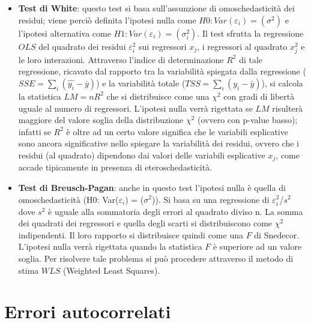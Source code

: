 \documentclass[a4page, 11pt]{article} %
\begin{document}
\begin{itemize}
\item \textbf{Test di White}: questo test si basa sull’assunzione di omoschedasticità dei residui; viene perciò definita l’ipotesi nulla come $H0: Var(\varepsilon_i) = (\sigma^2)$ e l’ipotesi alternativa come $H1: Var(\varepsilon_i ) = ( \sigma^2_i )$.
Il test sfrutta la regressione $OLS$ del quadrato dei residui $\varepsilon_i^2$ sui regressori $x_j$, i regressori al quadrato $x_j^2$ e le loro interazioni.
Attraverso l'indice di determinazione $R^{2}$ di tale regressione, ricavato dal rapporto tra la variabilità spiegata dalla regressione ($SSE = \sum_{i}(\hat{y_i} - \bar{y})$) e la variabilità totale ($TSS = \sum_{i} (y_i - \bar{y})$), si calcola la statistica $LM=n R^{2}$ che si distribuisce come una $\chi^{2}$ con gradi di libertà uguale al numero di regressori. L’ipotesi nulla verrà rigettata se $LM$ risulterà maggiore del valore soglia della distribuzione $\chi^{2}$ (ovvero con p-value basso); %
infatti se $R^{2}$ è oltre ad un certo valore significa che le variabili esplicative sono ancora significative nello spiegare la variabilità dei residui, ovvero che i residui (al quadrato) dipendono dai valori delle variabili esplicative $x_j$, come accade tipicamente in presenza di eteroschedasticità.

\item \textbf{Test di Breusch-Pagan}: anche in questo test l’ipotesi nulla è quella di omoschedasticità (H0: Var($\varepsilon_i$) = ($\sigma^2$)).
Si basa su una regressione di $\varepsilon^{2}_i$/$s^{2}$ dove $s^{2}$ è uguale alla sommatoria degli errori al quadrato diviso n. La somma dei quadrati dei regressori e quella degli scarti si distribuiscono come $\chi^{2}$ indipendenti. Il loro rapporto si distribuisce quindi come una $F$ di Snedecor. L’ipotesi nulla verrà rigettata quando la statistica $F$ è superiore ad un valore soglia.
Per risolvere tale problema si può procedere attraverso il metodo di stima $WLS$ (Weighted Least Squares).
\end{itemize}

\section{Errori autocorrelati}
\end{document}
